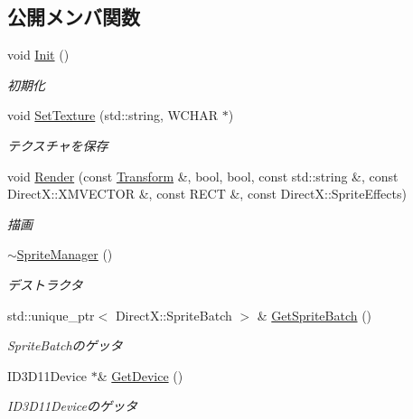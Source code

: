 \subsection*{公開メンバ関数}
\begin{DoxyCompactItemize}
\item 
void \mbox{\hyperlink{class_sprite_manager_a82941ce284548c762f250220ea58f43c}{Init}} ()
\begin{DoxyCompactList}\small\item\em 初期化 \end{DoxyCompactList}\item 
void \mbox{\hyperlink{class_sprite_manager_a5b41702bb7476fb1c148b3e2c81d6b06}{Set\+Texture}} (std\+::string, W\+C\+H\+AR $\ast$)
\begin{DoxyCompactList}\small\item\em テクスチャを保存 \end{DoxyCompactList}\item 
void \mbox{\hyperlink{class_sprite_manager_a4cdd5540bace32d5742ea4df648d87e9}{Render}} (const \mbox{\hyperlink{class_transform}{Transform}} \&, bool, bool, const std\+::string \&, const Direct\+X\+::\+X\+M\+V\+E\+C\+T\+OR \&, const R\+E\+CT \&, const Direct\+X\+::\+Sprite\+Effects)
\begin{DoxyCompactList}\small\item\em 描画 \end{DoxyCompactList}\item 
\mbox{\hyperlink{class_sprite_manager_ae01a31b1c80f676604ba55c93b499e1f}{$\sim$\+Sprite\+Manager}} ()
\begin{DoxyCompactList}\small\item\em デストラクタ \end{DoxyCompactList}\item 
std\+::unique\+\_\+ptr$<$ Direct\+X\+::\+Sprite\+Batch $>$ \& \mbox{\hyperlink{class_sprite_manager_a0b82bacf33d0b558657c8e9841daf9d9}{Get\+Sprite\+Batch}} ()
\begin{DoxyCompactList}\small\item\em Sprite\+Batchのゲッタ \end{DoxyCompactList}\item 
I\+D3\+D11\+Device $\ast$\& \mbox{\hyperlink{class_sprite_manager_ac9e2c44cc43775d9802612bd4be9bac3}{Get\+Device}} ()
\begin{DoxyCompactList}\small\item\em I\+D3\+D11\+Deviceのゲッタ \end{DoxyCompactList}\item 

\end{DoxyCompactItemize}
